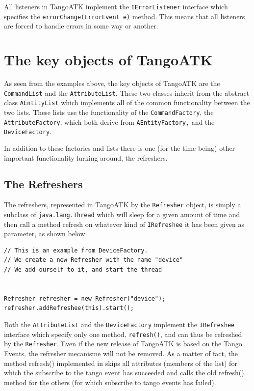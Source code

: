 All listeners in TangoATK implement the \texttt{IErrorListener} interface
which specifies the \texttt{errorChange(ErrorEvent e)} method. This
means that all listeners are forced to handle errors in some way or
another.


\section{The key objects of TangoATK}

As seen from the examples above, the key objects of TangoATK are the
\texttt{CommandList} and the \texttt{AttributeList}.
These two classes inherit from the abstract class \texttt{AEntityList}
which implements all of the common functionality between the two lists.
These lists use the functionality of the \texttt{CommandFactory},
the \texttt{AttributeFactory}, which both derive from \texttt{AEntityFactory,}
and the \texttt{DeviceFactory}.

In addition to these factories and lists there is one (for the time
being) other important functionality lurking around, the refreshers.


\subsection{The Refreshers}

The refreshers, represented in TangoATK by the \texttt{Refresher}
object, is simply a subclass of \texttt{java.lang.Thread} which will
sleep for a given amount of time and then call a method refresh on
whatever kind of \texttt{IRefreshee} it has been given as parameter,
as shown below


\begin{verbatim}
// This is an example from DeviceFactory.
// We create a new Refresher with the name "device"
// We add ourself to it, and start the thread
 

Refresher refresher = new Refresher("device");
refresher.addRefreshee(this).start();

\end{verbatim}


Both the \texttt{AttributeList} and the \texttt{DeviceFactory}
implement the \texttt{IRefreshee} interface which specify only one
method, \texttt{refresh()}, and can thus be refreshed by the \texttt{Refresher}.
Even if the new release of TangoATK is based on the Tango Events,
the refresher mecanisme will not be removed. As a matter of fact,
the method refresh() implemented in  skips all
attributes (members of the list) for which the subscribe
to the tango event has succeeded and calls the old refresh() method
for the others (for which subscribe to tango events has failed). 

